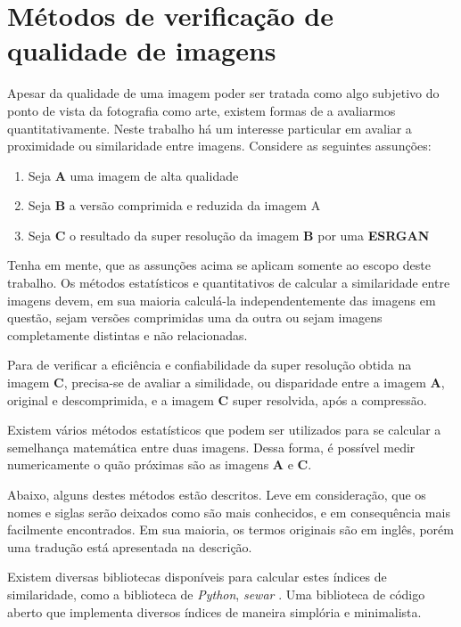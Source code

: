 \section{Métodos de verificação de qualidade de imagens}
\label{sec:qualidade-imagem}

Apesar da qualidade de uma imagem poder ser tratada como algo subjetivo do ponto de vista da fotografia como arte, existem formas de a avaliarmos quantitativamente. Neste trabalho há um interesse particular em avaliar a proximidade ou similaridade entre imagens. Considere as seguintes assunções:

\begin{enumerate}
    \item Seja \textbf{A} uma imagem de alta qualidade
    \item Seja \textbf{B} a versão comprimida e reduzida da imagem A
    \item Seja \textbf{C} o resultado da super resolução da imagem \textbf{B} por uma \textbf{ESRGAN}
\end{enumerate}

Tenha em mente, que as assunções acima se aplicam somente ao escopo deste trabalho. Os métodos estatísticos e quantitativos de calcular a similaridade entre imagens devem, em sua maioria calculá-la independentemente das imagens em questão, sejam versões comprimidas uma da outra ou sejam imagens completamente distintas e não relacionadas.

Para de verificar a eficiência e confiabilidade da super resolução obtida na imagem \textbf{C}, precisa-se de avaliar a similidade, ou disparidade entre a imagem \textbf{A}, original e descomprimida, e a imagem \textbf{C} super resolvida, após a compressão.

Existem vários métodos estatísticos que podem ser utilizados para se calcular a semelhança matemática entre duas imagens. Dessa forma, é possível medir numericamente o quão próximas são as imagens \textbf{A} e \textbf{C}.

Abaixo, alguns destes métodos estão descritos. Leve em consideração, que os nomes e siglas serão deixados como são mais conhecidos, e em consequência mais facilmente encontrados. Em sua maioria, os termos originais são em inglês, porém uma tradução está apresentada na descrição.

Existem diversas bibliotecas disponíveis para calcular estes índices de similaridade, como a biblioteca de \textit{Python}, \textit{sewar} \cite{khalel_sewar_2023}. Uma biblioteca de código aberto que implementa diversos índices de maneira simplória e minimalista.


